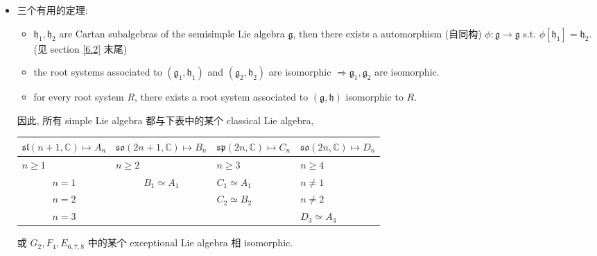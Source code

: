 \begin{itemize}
	\item 三个有用的定理:
	\begin{itemize}
		\item $\mathfrak{h}_1, \mathfrak{h}_2$ are Cartan subalgebras of the semisimple Lie algebra $\mathfrak{g}$, then there exists a automorphism (自同构) $\phi : \mathfrak{g} \rightarrow \mathfrak{g}$ s.t. $\phi[\mathfrak{h}_1] = \mathfrak{h}_2$. (见 section \ref{6.2} 末尾)
		
		\item the root systems associated to $(\mathfrak{g}_1, \mathfrak{h}_1)$ and $(\mathfrak{g}_2, \mathfrak{h}_2)$ are isomorphic $\Longrightarrow \mathfrak{g}_1, \mathfrak{g}_2$ are isomorphic.
		
		\item for every root system $R$, there exists a root system associated to $(\mathfrak{g}, \mathfrak{h})$ isomorphic to $R$.
	\end{itemize}
	因此, 所有 simple Lie algebra 都与下表中的某个 classical Lie algebra,
	\begin{center}
		\begin{tabularx}{\linewidth}{KKKK}
			\toprule
			$\mathfrak{sl}(n + 1, \mathbb{C}) \mapsto A_n$ & $\mathfrak{so}(2 n + 1, \mathbb{C}) \mapsto B_n$ & $\mathfrak{sp}(2 n, \mathbb{C}) \mapsto C_n$ & $\mathfrak{so}(2 n, \mathbb{C}) \mapsto D_n$ \\
			\midrule
			$n \geq 1$ & $n \geq 2$ & $n \geq 3$ & $n \geq 4$ \\
			\midrule
			 &  & $C_1 \simeq A_1$ & $n \neq 1$ \\
			 &  & $C_2 \simeq B_2$ & $n \neq 2$ \\
			 &  &  & $D_3 \simeq A_3$ \\
			\bottomrule
		\end{tabularx}
	\end{center}
	或 $G_2, F_4, E_{6, 7, 8}$ 中的某个 exceptional Lie algebra 相 isomorphic.
\end{itemize}
